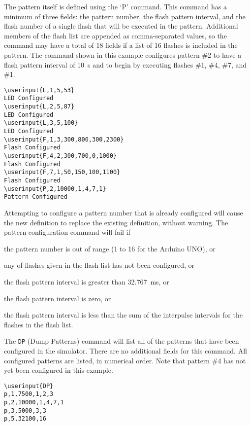 \documentclass[letterpaper,11pt]{article}
\newcommand\userinput[1]{\textbf{#1}}
\begin{document}
The pattern itself is defined using the `P' command. This command has a minimum
of three fields: the pattern number, the flash pattern interval, and the flash
number of a single flash that will be executed in the pattern. Additional
members of the flash list are appended as comma-separated values, so the
command may have a total of 18 fields if a list of 16 flashes is included in
the pattern. The command shown in this example configures pattern \#2 to have
a flash pattern interval of \SI{10}{\second} and to begin by executing flashes
\#1, \#4, \#7, and \#1.

\begin{tcolorbox}
\begin{Verbatim}[commandchars=\\\{\}]
\userinput{L,1,5,53}
LED Configured
\userinput{L,2,5,87}
LED Configured
\userinput{L,3,5,100}
LED Configured
\userinput{F,1,3,300,800,300,2300}
Flash Configured
\userinput{F,4,2,300,700,0,1000}
Flash Configured
\userinput{F,7,1,50,150,100,1100}
Flash Configured
\userinput{P,2,10000,1,4,7,1}
Pattern Configured
\end{Verbatim}
\end{tcolorbox}

Attempting to configure a pattern number that is already configured will cause
the new definition to replace the existing definition, without warning.
The pattern configuration command will fail if
\begin{compactitem}
  \item the pattern number is out of range (1 to 16 for the Arduino UNO), or
  \item any of flashes given in the flash list has not been configured, or
  \item the flash pattern interval is greater than \SI{32.767}{\ms}, or
  \item the flash pattern interval is zero, or
  \item the flash pattern interval is less than the sum of the interpulse
    intervals for the flashes in the flash list.
\end{compactitem}

The \texttt{DP} (Dump Patterns) command will list all of the patterns that
have been configured in the simulator. There are no additional fields for this
command. All configured patterns are listed, in numerical order. Note that
pattern \#4 has not yet been configured in this example.

\begin{tcolorbox}
\begin{Verbatim}[commandchars=\\\{\}]
\userinput{DP}
p,1,7500,1,2,3
p,2,10000,1,4,7,1
p,3,5000,3,3
p,5,32100,16
\end{Verbatim}
\end{tcolorbox}
\end{document}
